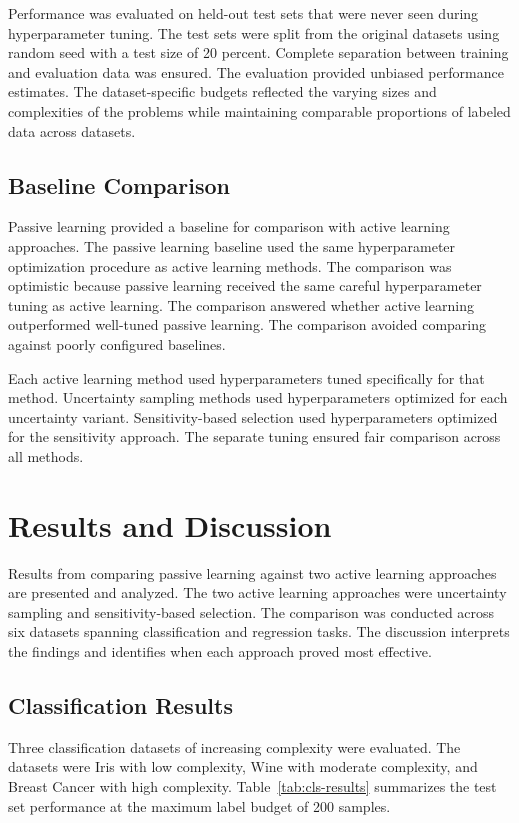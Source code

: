 \documentclass[conference]{IEEEtran}
\begin{document}
Performance was evaluated on held-out test sets that were never seen during hyperparameter tuning. The test sets were split from the original datasets using random seed with a test size of 20 percent. Complete separation between training and evaluation data was ensured. The evaluation provided unbiased performance estimates. The dataset-specific budgets reflected the varying sizes and complexities of the problems while maintaining comparable proportions of labeled data across datasets.

\subsection{Baseline Comparison}

Passive learning provided a baseline for comparison with active learning approaches. The passive learning baseline used the same hyperparameter optimization procedure as active learning methods. The comparison was optimistic because passive learning received the same careful hyperparameter tuning as active learning. The comparison answered whether active learning outperformed well-tuned passive learning. The comparison avoided comparing against poorly configured baselines.

Each active learning method used hyperparameters tuned specifically for that method. Uncertainty sampling methods used hyperparameters optimized for each uncertainty variant. Sensitivity-based selection used hyperparameters optimized for the sensitivity approach. The separate tuning ensured fair comparison across all methods.

\section{Results and Discussion}

Results from comparing passive learning against two active learning approaches are presented and analyzed. The two active learning approaches were uncertainty sampling and sensitivity-based selection. The comparison was conducted across six datasets spanning classification and regression tasks. The discussion interprets the findings and identifies when each approach proved most effective.

\subsection{Classification Results}

Three classification datasets of increasing complexity were evaluated. The datasets were Iris with low complexity, Wine with moderate complexity, and Breast Cancer with high complexity. Table~\ref{tab:cls-results} summarizes the test set performance at the maximum label budget of 200 samples.
\end{document}
